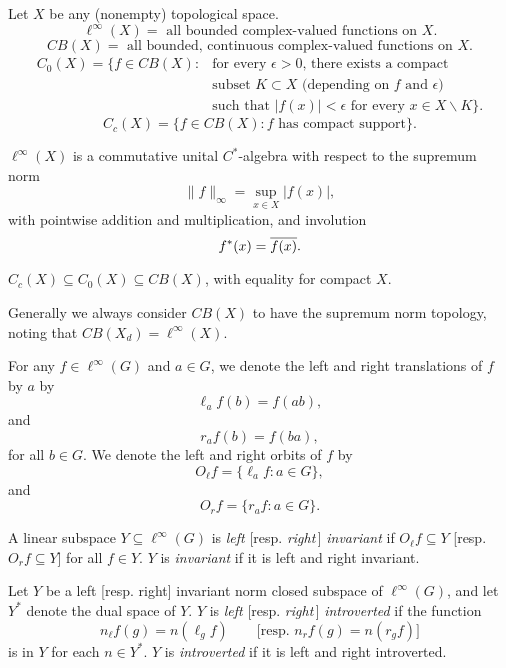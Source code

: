 \documentclass[landscape]{slides}
\begin{document}
\begin{slide}
Let $X$ be any (nonempty) topological space.
\[
\ell^\infty(X) =\text{ all bounded complex-valued functions on }X.
\]
\[
CB(X) = \text{ all bounded, continuous complex-valued functions on }X.
\]
\begin{align*}
C_0 (X) = \{f\in CB(X): &\text{for every $\epsilon >0$, there exists a compact} \\
&\text{subset $K\subset X$ (depending on $f$ and $\epsilon$)}\\
&\text{such that $|f(x)| < \epsilon$ for every $x\in X\backslash K$}\}.
\end{align*}
\[
C_c (X) = \{f\in CB(X):\text{$f$ has compact support}\}.
\]
\end{slide}

\begin{slide}
$\ell^\infty(X)$ is a commutative unital $C^*$-algebra with respect to the supremum norm
\[
\|f\|_\infty = \sup_{x\in X} |f(x)|,
\]
with pointwise addition and multiplication, and involution
\[
f^*(x) = \overline{f(x)}.
\]

$C_c(X) \subseteq C_0(X) \subseteq CB(X)$, with equality for compact $X$.

Generally we always consider $CB(X)$ to have the
supremum norm topology, noting that $CB(X_d) = \ell^\infty(X)$.
\end{slide}

\begin{slide}
For any $f\in \ell^\infty(G)$ and $a\in G$, we denote the left and right translations
of $f$ by $a$ by
\begin{equation}\label{translations}
\ell_a f(b) = f(ab),
\end{equation}
and
\begin{equation}
r_a f(b) = f(ba),
\end{equation}
for all $b\in G$.
We denote the left and right orbits of $f$ by
\[
O_\ell f = \{ \ell_a f: a\in G \},
\]
and
\[
O_r f = \{ r_a f: a\in G \}.
\]
\end{slide}

\begin{slide}
A linear subspace $Y \subseteq \ell^\infty(G)$ is {\it left} [resp. {\it right}\,] {\it invariant} if
$O_\ell f \subseteq Y$ [resp. $O_r f \subseteq Y$] for all $f\in Y$.  $Y$ is {\it invariant}
if it is left and right invariant.

Let $Y$ be a left [resp. right] invariant norm closed subspace of $\ell^\infty(G)$,
and let $Y^*$ denote the dual space of $Y$.  $Y$ is {\it left} [resp. {\it right}\,] {\it introverted}
if the function
\begin{equation}\label{introversions}
n_\ell f(g) = n(\ell_g f)\qquad \text{[resp. }n_r f(g) = n(r_g f)\text{]}
\end{equation}
is in $Y$ for each $n\in Y^*$.
$Y$ is {\it introverted} if it is left and right introverted.
\end{slide}
\end{document}
